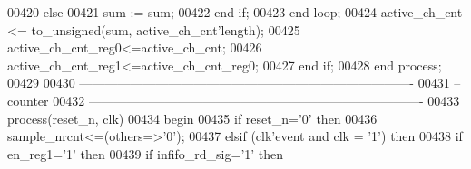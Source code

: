\begin{DoxyCode}
00420            \textcolor{keywordflow}{else} 
00421                \textcolor{vhdlchar}{sum} \textcolor{vhdlchar}{:=} \textcolor{vhdlchar}{sum};
00422              \textcolor{keywordflow}{end} \textcolor{keywordflow}{if};
00423         \textcolor{keywordflow}{end} \textcolor{keywordflow}{loop}; 
00424             \textcolor{vhdlchar}{active_ch_cnt} \textcolor{vhdlchar}{<=} \textcolor{vhdlchar}{to\_unsigned}\textcolor{vhdlchar}{(}\textcolor{vhdlchar}{sum}\textcolor{vhdlchar}{,} \textcolor{vhdlchar}{active_ch_cnt}\textcolor{vhdlchar}{'}\textcolor{vhdlkeyword}{length}\textcolor{vhdlchar}{)};
00425             \textcolor{vhdlchar}{active_ch_cnt_reg0}\textcolor{vhdlchar}{<=}\textcolor{vhdlchar}{active_ch_cnt};
00426             \textcolor{vhdlchar}{active_ch_cnt_reg1}\textcolor{vhdlchar}{<=}\textcolor{vhdlchar}{active_ch_cnt_reg0}; 
00427       \textcolor{keywordflow}{end} \textcolor{keywordflow}{if}; 
00428     \textcolor{keywordflow}{end} \textcolor{keywordflow}{process};    
00429       
00430 \textcolor{keyword}{-------------------------------------------------------------------------------}
00431 \textcolor{keyword}{-- counter }
00432 \textcolor{keyword}{-------------------------------------------------------------------------------   }
00433       \textcolor{keywordflow}{process}(reset_n, clk)
00434 \textcolor{vhdlkeyword}{    begin}
00435       \textcolor{keywordflow}{if} \textcolor{vhdlchar}{reset_n}\textcolor{vhdlchar}{=}\textcolor{vhdlchar}{'}\textcolor{vhdllogic}{}\textcolor{vhdllogic}{0}\textcolor{vhdlchar}{'} \textcolor{keywordflow}{then}
00436           \textcolor{vhdlchar}{sample_nrcnt}\textcolor{vhdlchar}{<=}\textcolor{vhdlchar}{(}\textcolor{keywordflow}{others}\textcolor{vhdlchar}{=}\textcolor{vhdlchar}{>}\textcolor{vhdlchar}{'}\textcolor{vhdllogic}{}\textcolor{vhdllogic}{0}\textcolor{vhdlchar}{'}\textcolor{vhdlchar}{)};
00437         \textcolor{keywordflow}{elsif} \textcolor{vhdlchar}{(}\textcolor{vhdlchar}{clk}\textcolor{vhdlchar}{'}\textcolor{vhdlkeyword}{event} \textcolor{keywordflow}{and} \textcolor{vhdlchar}{clk} \textcolor{vhdlchar}{=} \textcolor{vhdlchar}{'}\textcolor{vhdllogic}{}\textcolor{vhdllogic}{1}\textcolor{vhdlchar}{'}\textcolor{vhdlchar}{)} \textcolor{keywordflow}{then}
00438           \textcolor{keywordflow}{if} \textcolor{vhdlchar}{en_reg1}\textcolor{vhdlchar}{=}\textcolor{vhdlchar}{'}\textcolor{vhdllogic}{}\textcolor{vhdllogic}{1}\textcolor{vhdlchar}{'} \textcolor{keywordflow}{then}
00439             \textcolor{keywordflow}{if} \textcolor{vhdlchar}{infifo_rd_sig}\textcolor{vhdlchar}{=}\textcolor{vhdlchar}{'}\textcolor{vhdllogic}{}\textcolor{vhdllogic}{1}\textcolor{vhdlchar}{'} \textcolor{keywordflow}{then} 

\end{DoxyCode}
